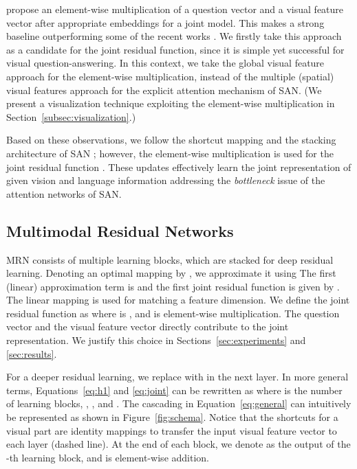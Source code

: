\documentclass{article}
\begin{document}
\citet{Lu2015} propose an element-wise multiplication of a question vector and a visual feature vector after appropriate embeddings for a joint model. This makes a strong baseline outperforming some of the recent works \cite{Noh2015,Andreas2016}. We firstly take this approach as a candidate for the joint residual function, since it is simple yet successful for visual question-answering. In this context, we take the global visual feature approach for the element-wise multiplication, instead of the multiple (spatial) visual features approach for the explicit attention mechanism of SAN. (We present a visualization technique exploiting the element-wise multiplication in Section~\ref{subsec:visualization}.)

Based on these observations, we follow the shortcut mapping and the stacking architecture of SAN \cite{Yang2015}; however, the element-wise multiplication is used for the joint residual function . These updates effectively learn the joint representation of given vision and language information addressing the \textit{bottleneck} issue of the attention networks of SAN.

\subsection{Multimodal Residual Networks}

MRN consists of multiple learning blocks, which are stacked for deep residual learning. Denoting an optimal mapping by , we approximate it using 
The first (linear) approximation term is  and the first joint residual function is given by . The linear mapping  is used for matching a feature dimension. We define the joint residual function as 
where  is , and  is element-wise multiplication. The question vector and the visual feature vector directly contribute to the joint representation. We justify this choice in Sections~\ref{sec:experiments} and \ref{sec:results}.

For a deeper residual learning, we replace  with  in the next layer. In more general terms, Equations~\ref{eq:h1} and \ref{eq:joint} can be rewritten as 
where  is the number of learning blocks, , , and . The cascading in Equation~\ref{eq:general} can intuitively be represented as shown in Figure~\ref{fig:schema}. Notice that the shortcuts for a visual part are identity mappings to transfer the input visual feature vector to each layer (dashed line). At the end of each block, we denote  as the output of the -th learning block, and  is element-wise addition.
\end{document}
